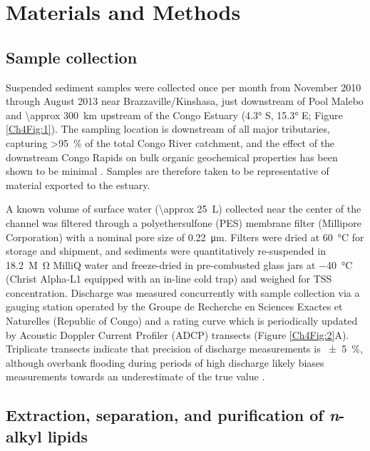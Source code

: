 \section{Materials and Methods}

\subsection{Sample collection}

Suspended sediment samples were collected once per month from November 2010 through August 2013 near Brazzaville/Kinshasa, just downstream of Pool Malebo and \SI{\approx 300}{km} upstream of the Congo Estuary (\ang{4.3} S, \ang{15.3} E; Figure \ref{Ch4Fig:1}). The sampling location is downstream of all major tributaries, capturing \SI{>95}{\%} of the total Congo River catchment, and the effect of the downstream Congo Rapids on bulk organic geochemical properties has been shown to be minimal \citep{Spencer:2012en}. Samples are therefore taken to be representative of material exported to the estuary.

A known volume of surface water (\SI{\approx 25}{L}) collected near the center of the channel was filtered through a polyethersulfone (PES) membrane filter (Millipore Corporation) with a nominal pore size of \SI{0.22}{\micro m}. Filters were dried at \SI{60}{\celsius} for storage and shipment, and sediments were quantitatively re-suspended in \SI{18.2}{M \ohm} MilliQ water and freeze-dried in pre-combusted glass jars at \SI{-40}{\celsius} (Christ Alpha-L1 equipped with an in-line cold trap) and weighed for TSS concentration. Discharge was measured concurrently with sample collection via a gauging station operated by the Groupe de Recherche en Sciences Exactes et Naturelles (Republic of Congo) and a rating curve which is periodically updated by Acoustic Doppler Current Profiler (ADCP) transects (Figure \ref{Ch4Fig:2}A). Triplicate transects indicate that precision of discharge measurements is \SI{\pm 5}{\%}, although overbank flooding during periods of high discharge likely biases measurements towards an underestimate of the true value \citep{Spencer:2014vp}.

\subsection{Extraction, separation, and purification of \textit{n}-alkyl lipids}

